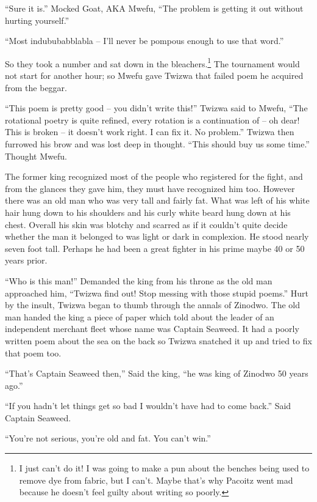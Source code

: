 ``Sure it is.'' Mocked Goat, AKA Mwe\-fu, ``The problem is getting it out without hurting yourself.''

``Most indububabblabla -- I'll never be pompous enough to use that word.''

\tbreak

So they took a number and sat down in the bleachers.\footnote{I just can't do it! I was going to make a pun about the benches being used to remove dye from fabric, but I can't. Maybe that's why Pa\-co\-itz went mad because he doesn't feel guilty about writing so poorly.} The tournament would not start for another hour; so Mwe\-fu gave Twi\-zwa that failed poem he acquired from the beggar.

``This poem is pretty good -- you didn't write this!'' Twi\-zwa said to Mwe\-fu, ``The rotational poetry is quite refined, every rotation is a continuation of -- oh dear! This is broken -- it doesn't work right. I can fix it. No problem.'' Twi\-zwa then furrowed his brow and was lost deep in thought. ``This should buy us some time.'' Thought Mwe\-fu.

The former king recognized most of the people who registered for the fight, and from the glances they gave him, they must have recognized him too. However there was an old man who was very tall and fairly fat. What was left of his white hair hung down to his shoulders and his curly white beard hung down at his chest. Overall his skin was blotchy and scarred as if it couldn't quite decide whether the man it belonged to was light or dark in complexion. He stood nearly seven foot tall. Perhaps he had been a great fighter in his prime maybe 40 or 50 years prior.

``Who is this man!'' Demanded the king from his throne as the old man approached him, ``Twi\-zwa find out! Stop messing with those stupid poems.'' Hurt by the insult, Twi\-zwa began to thumb through the annals of Zi\-no\-dwo. The old man handed the king a piece of paper which told about the leader of an independent merchant fleet whose name was Captain Seaweed. It had a poorly written poem about the sea on the back so Twi\-zwa snatched it up and tried to fix that poem too.

``That's Captain Seaweed then,'' Said the king, ``he was king of Zi\-no\-dwo 50 years ago.''

``If you hadn't let things get so bad I wouldn't have had to come back.'' Said Captain Seaweed.

``You're not serious, you're old and fat. You can't win.''

